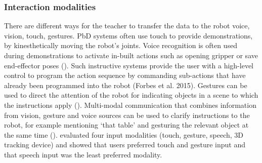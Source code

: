 \subsubsection{Interaction modalities}
There are different ways for the teacher to transfer the data to the robot \eg voice, vision, touch, gestures.
PbD systems often use touch to provide demonstrations, \ie by kinesthetically moving the robot's joints.
Voice recognition is often used during demonstrations to activate in-built actions such as opening gripper or save end-effector poses (\cite{alexandrova2014robot}).
Such instructive systems provide the user with a high-level control to program the action sequence by commanding sub-actions that have already been programmed into the robot (Forbes et al. 2015).
Gestures can be used to direct the attention of the robot for indicating objects in a scene to which the instructions apply (\cite{bibid}).
Multi-modal communication that combines information from vision, gesture and voice sources can be used to clarify instructions to the robot, for example mentioning `that table' and gesturing the relevant object at the same time (\cite{bibid}).
\cite{profanter2015analysis} evaluated four input modalities (touch, gesture, speech, 3D tracking device) and showed that users preferred touch and gesture input and that speech input was the least preferred modality.





